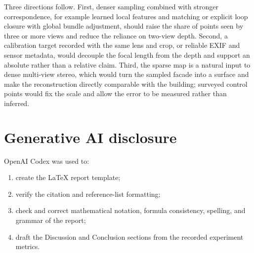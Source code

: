 \documentclass[11pt,a4paper]{article}
\begin{document}
Three directions follow. First, denser sampling combined with stronger correspondence, for example learned local features and matching or explicit loop closure with global bundle adjustment, should raise the share of points seen by three or more views and reduce the reliance on two-view depth. Second, a calibration target recorded with the same lens and crop, or reliable EXIF and sensor metadata, would decouple the focal length from the depth and support an absolute rather than a relative claim. Third, the sparse map is a natural input to dense multi-view stereo, which would turn the sampled facade into a surface and make the reconstruction directly comparable with the building; surveyed control points would fix the scale and allow the error to be measured rather than inferred.

\section{Generative AI disclosure}

OpenAI Codex was used to:

\begin{enumerate}
  \item create the LaTeX report template;
  \item verify the citation and reference-list formatting;
  \item check and correct mathematical notation, formula consistency, spelling, and grammar of the report;
  \item draft the Discussion and Conclusion sections from the recorded experiment metrics.
\end{enumerate}



\end{document}
